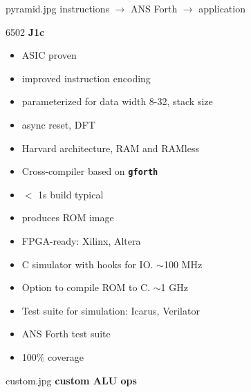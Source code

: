 \documentclass[compress,mathserif]{beamer}
\newcommand{\mach}[1]{\texttt{\textbf{#1}}}
\begin{document}
\begin{imageframe}{pyramid.jpg}
  {instructions $\rightarrow$ ANS Forth $\rightarrow$ application}
\end{imageframe}

\begin{imageframe}{6502}
  {\bf\Huge J1c}
\end{imageframe}

\begin{frame}
\begin{itemize}
   \item ASIC proven
   \item improved instruction encoding
   \item parameterized for data width 8-32, stack size
   \item async reset, DFT
   \item Harvard architecture, RAM and RAMless
\end{itemize}
\end{frame}

\begin{frame}
\begin{itemize}
   \item Cross-compiler based on \mach{gforth}
   \item $<$ 1s build typical
   \item produces ROM image
\end{itemize}
\end{frame}

\begin{frame}
\begin{itemize}
   \item FPGA-ready: Xilinx, Altera
   \item C simulator with hooks for IO. $\sim$100 MHz
   \item Option to compile ROM to C. $\sim$1 GHz
\end{itemize}
\end{frame}

\begin{frame}
\begin{itemize}
   \item Test suite for simulation: Icarus, Verilator
   \item ANS Forth test suite
   \item 100\% coverage
\end{itemize}
\end{frame}

\begin{imageframe}{custom.jpg}
  {\bf\LARGE custom ALU ops}
\end{imageframe}
\end{document}
